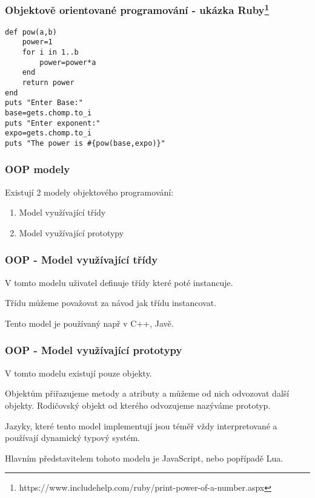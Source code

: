 \begin{frame}[fragile]
    \frametitle{Objektově orientované programování - ukázka Ruby\footnote{https://www.includehelp.com/ruby/print-power-of-a-number.aspx}}

\begin{lstlisting}[]
def pow(a,b)
    power=1
    for i in 1..b
        power=power*a
    end
    return power
end
puts "Enter Base:"
base=gets.chomp.to_i
puts "Enter exponent:"
expo=gets.chomp.to_i
puts "The power is #{pow(base,expo)}"  
\end{lstlisting}
\end{frame}

\begin{frame}
    \frametitle{OOP modely}
        Existují 2 modely objektového programování:
        \begin{enumerate}
            \item Model využívající třídy
            \item Model využívající prototypy
        \end{enumerate} 
\end{frame}

\begin{frame}
    \frametitle{OOP - Model využívající třídy}
    V tomto modelu uživatel definuje třídy které poté instancuje.

    Třídu můžeme považovat za návod jak třídu instancovat.

    Tento model je používaný např v C++, Javě.
\end{frame}

\begin{frame}
    \frametitle{OOP - Model využívající prototypy}
    V tomto modelu existují pouze objekty. %

    Objektům přiřazujeme metody a atributy a můžeme od nich odvozovat další objekty. Rodičovský objekt od kterého odvozujeme nazýváme prototyp.

    Jazyky, které tento model implementují jsou téměř vždy interpretované a používají dynamický typový systém.

    Hlavním představitelem tohoto modelu je JavaScript, nebo popřípadě Lua.



\end{frame}


